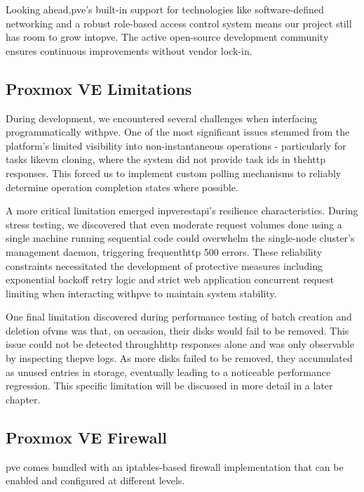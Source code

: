         Looking ahead,\ac{pve}'s built-in support for technologies like software-defined networking and a robust role-based access control 
        system means our project still has room to grow into\ac{pve}. The active open-source development community ensures continuous 
        improvements without vendor lock-in.

    \subsection{Proxmox VE Limitations}

        During development, we encountered several challenges when interfacing programmatically with\ac{pve}. One of the most significant 
        issues stemmed from the platform's limited visibility into non-instantaneous operations - particularly for tasks like\ac{vm} cloning, 
        where the system did not provide task ids in the\ac{http} responses. This forced us to implement custom polling mechanisms to reliably 
        determine operation completion states where possible.

        A more critical limitation emerged in\ac{pve}\ac{rest}\ac{api}'s resilience characteristics. During stress testing, we discovered that 
        even moderate request volumes done using a single machine running sequential code could overwhelm the single-node cluster's management 
        daemon, triggering frequent\ac{http} 500 errors. These reliability constraints necessitated the development of protective measures 
        including exponential backoff retry logic and strict web application concurrent request limiting when interacting with\ac{pve} to maintain system stability.

        One final limitation discovered during performance testing of batch creation and deletion of\ac{vm}s was that, on occasion, their disks 
        would fail to be removed. This issue could not be detected through\ac{http} responses alone and was only observable by inspecting the\ac{pve} 
        logs. As more disks failed to be removed, they accumulated as unused entries in storage, eventually leading to a noticeable performance regression. 
        This specific limitation will be discussed in more detail in a later chapter.

    \subsection{Proxmox VE Firewall}

        \ac{pve} comes bundled with an iptables-based firewall implementation that can be enabled and configured at different levels.

